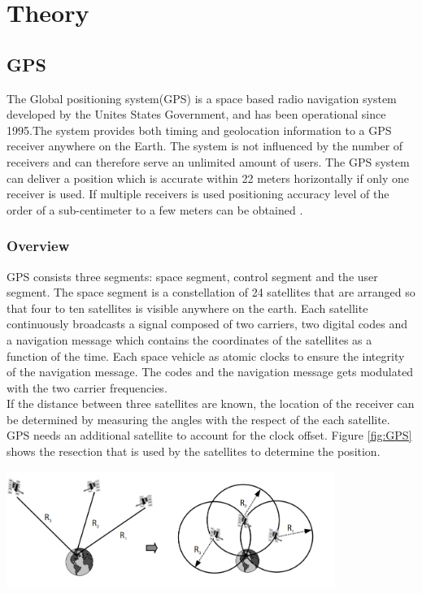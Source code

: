 



\chapter{Theory}
\section{GPS}
The Global positioning system(GPS) is a space based radio navigation system developed by the Unites States Government, and has been operational since 1995.The system provides both timing and geolocation information to a GPS receiver anywhere on the Earth.  The system is not influenced by the number of receivers and can therefore serve an unlimited amount of users. The GPS system can deliver a position which is accurate within 22 meters horizontally if only one receiver is used. If multiple receivers is used positioning accuracy level of the order of a sub-centimeter to a few meters can be obtained \cite{GPS}. 

\subsection{Overview}
GPS consists three segments: space segment, control segment and the user segment. The space segment is a constellation of 24 satellites that are arranged so that  four to ten satellites is visible anywhere on the earth. Each satellite continuously broadcasts a signal composed of two carriers, two digital codes and a navigation message which contains the coordinates of the satellites as a function of the time. Each space vehicle as atomic clocks to ensure the integrity of the navigation message. The codes and the navigation message gets modulated with the two carrier frequencies.  \\If the distance between three satellites are known, the location of the receiver can be determined by measuring the angles with the respect of the each satellite.  GPS needs an additional satellite to account for the clock offset. Figure \ref{fig:GPS} shows the resection that is used by the satellites to determine the position.\\

\begin{minipage}[t]{0.8\textwidth}
\centering
    \includegraphics[width=0.8\textwidth]{Images/gps.PNG}\\
    \captionsetup{justification=centering}
    \label{fig:GPS}
\end{minipage}


